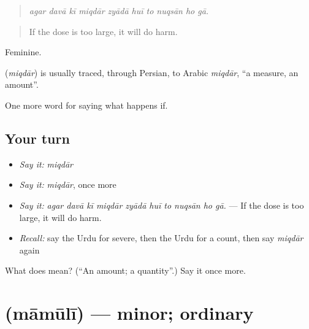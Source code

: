 \begin{quote}
         
\end{quote}

\begin{quote}
\emph{agar davā kī miqdār zyādā huī to nuqsān ho gā.}
\end{quote}

\begin{quote}
If the dose is too large, it will do harm.
\end{quote}

Feminine.

\begin{cousinweb}
\textbf{} (\emph{miqdār}) is usually traced, through Persian, to Arabic \emph{miqdār}, \textquotedblleft{}a measure, an amount\textquotedblright{}.
\end{cousinweb}

\begin{grammarlens}[title={What you've built}]
One more word for saying what happens if.
\end{grammarlens}

\subsection*{Your turn}
\begin{itemize}
\raggedright
  \item \emph{Say it:} \emph{miqdār}
  \item \emph{Say it:} \emph{miqdār}, once more
  \item \emph{Say it:} \emph{agar davā kī miqdār zyādā huī to nuqsān ho gā.} — If the dose is too large, it will do harm.
  \item \emph{Recall:} say the Urdu for severe, then the Urdu for a count, then say \emph{miqdār} again
\end{itemize}

\begin{tcolorbox}[breakable,colback=teal!4,colframe=teal!35!black,title={Before you move on}]
What does  mean? (\textquotedblleft{}An amount; a quantity\textquotedblright{}.) Say it once more.
\end{tcolorbox}
\section[\texorpdfstring{\ur{معمولی} (māmūlī)}{معمولی (māmūlī)}]{ (māmūlī) — minor; ordinary}

